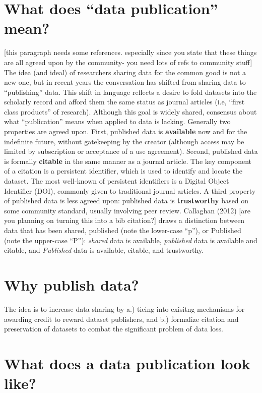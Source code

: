\documentclass{article}
\begin{document}
\section{What does ``data publication'' mean?}\label{what-does-data-publication-mean}
[this paragraph needs some references. especially since you state that these things are all agreed upon by the community- you need lots of refs to community stuff]
The idea (and ideal) of researchers sharing data for the common good is not a new one, but in recent years the conversation has shifted from sharing data to ``publishing'' data. This shift in language reflects a desire to fold datasets into the scholarly record and afford them the same status as journal articles (i.e, ``first class products'' of research). Although this goal is widely shared, consensus about what ``publication'' means when applied to data is lacking. Generally two properties are agreed upon. First, published data is \textbf{available} now and for the indefinite future, without gatekeeping by the creator (although access may be limited by subscription or acceptance of a use agreement). Second, published data is formally \textbf{citable} in the same manner as a journal article. The key component of a citation is a persistent identifier, which is used to identify and locate the dataset. The most well-known of persistent identifiers is a Digital Object Identifier (DOI), commonly given to traditional journal articles. A third property of published data is less agreed upon: published data is \textbf{trustworthy} based on some community standard, usually involving peer review. Callaghan (2012) [are you planning on turning this into a bib citation?] draws a distinction between data that has been shared, published (note the lower-case ``p''), or Published (note the upper-case ``P''): \textit{shared} data is available, \textit{published} data is available and citable, and \textit{Published} data is available, citable, and trustworthy.

\section{Why publish data?}\label{why-publish-data}

The idea is to increase data sharing by a.) tieing into exisitng mechanisms for awarding credit to reward dataset publishers, and b.) formalize citation and preservation of datasets to combat the significant problem of data loss.

\section{What does a data publication look like?}\label{what-does-a-data-publication-look-like}
\end{document}
